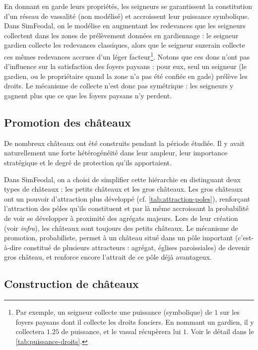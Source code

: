 En donnant en garde leurs propriétés, les seigneurs se garantissent la constitution d'un réseau de vassalité (non modélisé) et accroissent leur puissance symbolique.
Dans SimFeodal, on le modélise en augmentant les redevances que les seigneurs collectent dans les zones de prélèvement données en gardiennage : le seigneur gardien collecte les redevances classiques, alors que le seigneur suzerain collecte ces mêmes redevances accrues d'un léger facteur\footnote{
Par exemple, un seigneur collecte une puissance (symbolique) de $1$ sur les foyers paysans dont il collecte les droits fonciers.
En nommant un \og gardien\fg{}, il y collectera $1.25$ de puissance, et le vassal récupèrera lui $1$. Voir le détail dans le \cref{tab:puissance-droits}.
}.
Notons que ces dons n'ont pas d'influence sur la satisfaction des foyers paysans : pour eux, seul un seigneur (le gardien, ou le propriétaire quand la zone n'a pas été confiée en gade) prélève les droits.
Le mécanisme de collecte n'est donc pas symétrique : les seigneurs y gagnent plus que ce que les foyers paysans n'y \og perdent\fg{}.

\subsection{Promotion des châteaux}

De nombreux châteaux ont été construits pendant la période étudiée.
Il y avait naturellement une forte hétérogénéité dans leur ampleur, leur importance stratégique et le degré de protection qu'ils apportaient.

Dans SimFeodal, on a choisi de simplifier cette hiérarchie en distinguant deux types de châteaux : les \og petits châteaux\fg{} et les \og gros châteaux\fg{}.
Les gros châteaux ont un pouvoir d'attraction plus développé (cf. \cref{tab:attraction-poles}), renforçant l'attraction des pôles qu'ils constituent et par là même accroissant la probabilité de voir se développer à proximité des agrégats majeurs.
Lors de leur création (voir \textit{infra}), les châteaux sont toujours des \og petits châteaux\fg{}.
Le mécanisme de promotion, probabiliste, permet à un château situé dans un pôle important (c'est-à-dire constitué de plusieurs attracteurs : agrégat, églises paroissiales) de devenir \og gros château\fg{}, et renforce encore l'attrait de ce pôle déjà avantageux.

\subsection{Construction de châteaux}

